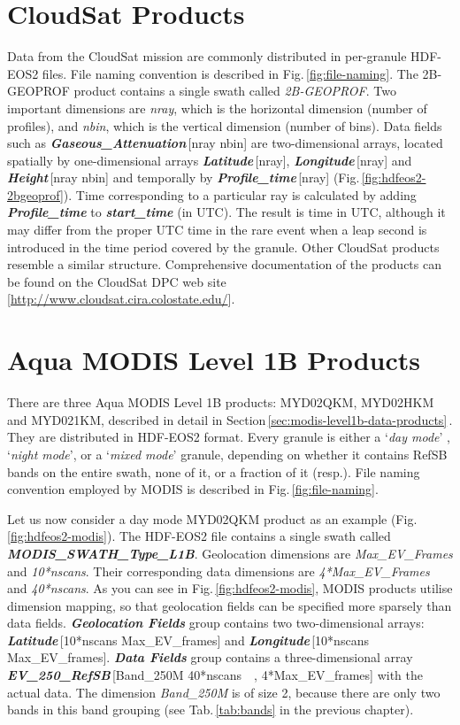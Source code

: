 \section{CloudSat Products}
Data from the CloudSat mission are commonly distributed in per-granule HDF-EOS2
files. File naming convention is described in
Fig.\,\ref{fig:file-naming}. The 2B-GEOPROF product contains a single swath
called \textit{2B-GEOPROF}. Two important dimensions are \textit{nray}, which is the
horizontal dimension (number of profiles), and \textit{nbin}, which is the
vertical dimension (number of bins). Data fields such as
\textbf{\textit{Gaseous\_Attenuation}}\,[nray\,\texttimes \,nbin] are
two-dimensional arrays, located spatially by one-dimensional arrays
\textbf{\textit{Latitude}}\,[nray],
\textbf{\textit{Longitude}}\,[nray]
and \textbf{\textit{Height}}\,[nray\,\texttimes\,nbin] and
temporally by \textbf{\textit{Profile\_time}}\,[nray]
(Fig.\,\ref{fig:hdfeos2-2bgeoprof}).
Time corresponding to a particular ray is calculated by adding
\textbf{\textit{Profile\_time}} to \textbf{\textit{start\_time}} (in UTC). The
result is time in UTC, although it may differ from the proper UTC time in the
rare event when a leap second is introduced in the time period covered by the
granule.
Other CloudSat products resemble a similar
structure. Comprehensive documentation of the products can be found on the
CloudSat DPC web site [\url{http://www.cloudsat.cira.colostate.edu/}].


\section{Aqua MODIS Level 1B Products}
There are three Aqua MODIS Level 1B products: MYD02QKM, MYD02HKM and
MYD021\-KM, described in detail in Section\,\ref{sec:modis-level1b-data-products}\,.
They are distributed in
HDF-EOS2
format. Every granule is either a `\textit{day mode}' , `\textit{night mode}', or a `\textit{mixed mode}'
granule, depending on whether it contains RefSB bands on the entire swath, none
of it, or a fraction of it (resp.). File naming convention employed by MODIS is
described in Fig.\,\ref{fig:file-naming}.

Let us now consider a day mode MYD02QKM product as an example
(Fig.\,\ref{fig:hdfeos2-modis}). The
HDF-EOS2 file contains a single swath
called \textbf{\textit{MODIS\_SWATH\_Type\_L1B}}. Geolocation dimensions are
\textit{Max\_EV\_Frames} and \textit{10*nscans}. Their corresponding data
dimensions are
\textit{4*Max\_EV\_Frames} and \textit{40*nscans}. As you can see in
Fig.\,\ref{fig:hdfeos2-modis}, MODIS products
utilise dimension mapping, so that geolocation fields can be specified more
sparsely than data fields. \textbf{\textit{Ge\-o\-lo\-ca\-ti\-on Fields}} group contains
two two-dimensional
arrays: \textbf{\textit{Latitude}}\,[10*nscans\,\texttimes\,Max\_EV\-\_frames] and
\textbf{\textit{Longitude}}\,[10*nscans\,\texttimes\,Max\_EV\_frames].
\textbf{\textit{Data Fields}}
group contains a three-dimen\-sional array
\textbf{\textit{EV\_250\_RefSB}}\,[Band\_250M\,\texttimes\,40*nscans\,
\texttimes\ ,
4*Max\_EV\_frames] with the actual data. The dimension
\textit{Band\_250M} is of size 2, because there are only two bands in this band
grouping (see Tab.\,\ref{tab:bands} in the previous chapter).

